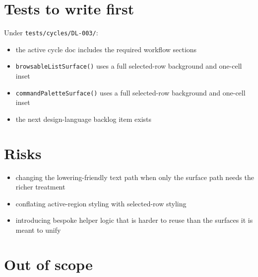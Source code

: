 \section{Tests to write first}\label{record-170-tests-to-write-first}

Under \texttt{t\allowbreak{}e\allowbreak{}s\allowbreak{}t\allowbreak{}s\allowbreak{}/\allowbreak{}c\allowbreak{}y\allowbreak{}c\allowbreak{}l\allowbreak{}e\allowbreak{}s\allowbreak{}/\allowbreak{}D\allowbreak{}L\allowbreak{}-\allowbreak{}0\allowbreak{}0\allowbreak{}3\allowbreak{}/}:

\begin{itemize}
\tightlist
\item
  the active cycle doc includes the required workflow sections
\item
  \texttt{b\allowbreak{}r\allowbreak{}o\allowbreak{}w\allowbreak{}s\allowbreak{}a\allowbreak{}b\allowbreak{}l\allowbreak{}e\allowbreak{}L\allowbreak{}i\allowbreak{}s\allowbreak{}t\allowbreak{}S\allowbreak{}u\allowbreak{}r\allowbreak{}f\allowbreak{}a\allowbreak{}c\allowbreak{}e\allowbreak{}(\allowbreak{})} uses a full selected-row background and one-cell inset
\item
  \texttt{c\allowbreak{}o\allowbreak{}m\allowbreak{}m\allowbreak{}a\allowbreak{}n\allowbreak{}d\allowbreak{}P\allowbreak{}a\allowbreak{}l\allowbreak{}e\allowbreak{}t\allowbreak{}t\allowbreak{}e\allowbreak{}S\allowbreak{}u\allowbreak{}r\allowbreak{}f\allowbreak{}a\allowbreak{}c\allowbreak{}e\allowbreak{}(\allowbreak{})} uses a full selected-row background and one-cell inset
\item
  the next design-language backlog item exists
\end{itemize}

\section{Risks}\label{record-170-risks}

\begin{itemize}
\tightlist
\item
  changing the lowering-friendly text path when only the surface path needs the richer treatment
\item
  conflating active-region styling with selected-row styling
\item
  introducing bespoke helper logic that is harder to reuse than the surfaces it is meant to unify
\end{itemize}

\section{Out of scope}\label{record-170-out-of-scope}

